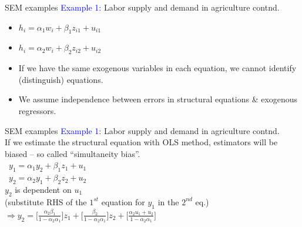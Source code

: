 \documentclass[usenames,dvipsnames]{beamer}
\begin{document}
\begin{frame}{SEM examples}
\textcolor{Blue}{Example 1:} Labor supply and demand in agriculture contnd.\\
\bigskip
\begin{itemize}
\item [] $h_i  = \alpha_1 w_i + \beta_1 z_{i1} + u_{i1}$
\item [] $h_i  = \alpha_2 w_i + \beta_2 z_{i2} + u_{i2}$ \\
\medskip
\item If we have the same exogenous variables in each equation, we cannot identify (distinguish) equations. \\
\medskip
\item We assume independence between errors in structural equations \& exogenous regressors. 
\end{itemize}
\end{frame}
\begin{frame}{SEM examples}
\textcolor{Blue}{Example 1:} Labor supply and demand in agriculture contnd.\\
\bigskip
If we estimate the structural equation with OLS method, estimators will be biased – so called ``simultaneity bias''. \\
\medskip
\quad \ $y_1  = \alpha_1 y_2 + \beta_1 z_1 + u_1 $ \\
\medskip
\quad \ $y_2  = \alpha_2 y_1 + \beta_2 z_2 + u_2 $ \\
\bigskip
$y_2$ is dependent on $u_1$ \\
(substitute RHS of the $1^{st}$ equation for $y_1$ in the $2^{nd}$ eq.)\\
\medskip
$\Rightarrow y_2  = \bigg[ \frac{\alpha_2 \beta_1}{1-\alpha_2 \alpha_1} \bigg] z_1 + \bigg[ \frac{\beta_2}{1 - \alpha_2 \alpha_1} \bigg] z_2 + \bigg[\frac{\alpha_2 u_1 + u_2}{1-\alpha_2 \alpha_1} \bigg] $ \\
\end{frame}
\end{document}
